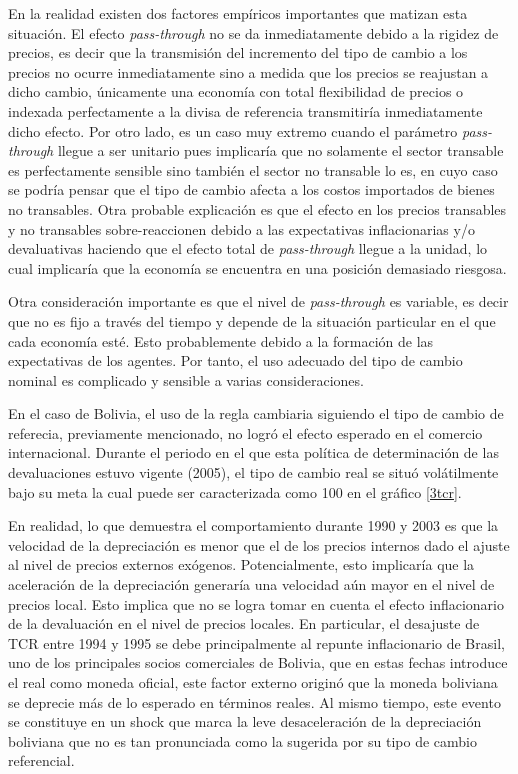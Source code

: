 \documentclass[12pt,letterpaper]{article}
\begin{document}
En la realidad existen dos factores empíricos importantes que matizan esta situación. El efecto \emph{pass-through} no se da inmediatamente debido a la rigidez de precios, es decir que la transmisión del incremento del tipo de cambio a los precios no ocurre inmediatamente sino a medida que los precios se reajustan a dicho cambio, únicamente una economía con total flexibilidad de precios o indexada perfectamente a la divisa de referencia transmitiría inmediatamente dicho efecto. Por otro lado, es un caso muy extremo cuando el parámetro \emph{pass-through} llegue a ser unitario pues implicaría que no solamente el sector transable es perfectamente sensible sino también el sector no transable lo es, en cuyo caso se podría pensar que el tipo de cambio afecta a los costos importados de bienes no transables. Otra probable explicación es que el efecto en los precios transables y no transables sobre-reaccionen debido a las expectativas inflacionarias y/o devaluativas haciendo que el efecto total de \emph{pass-through} llegue a la unidad, lo cual implicaría que la economía se encuentra en una posición demasiado riesgosa.

Otra consideración importante es que el nivel de \emph{pass-through} es variable, es decir que no es fijo a través del tiempo y depende de la situación particular en el que cada economía esté. Esto probablemente debido a la formación de las expectativas de los agentes. Por tanto, el uso adecuado del tipo de cambio nominal es complicado y sensible a varias consideraciones.

En el caso de Bolivia, el uso de la regla cambiaria siguiendo el tipo de cambio de referecia, previamente mencionado, no logró el efecto esperado en el comercio internacional. Durante el periodo en el que esta política de determinación de las devaluaciones estuvo vigente (2005), el tipo de cambio real se situó volátilmente bajo su meta la cual puede ser caracterizada como 100 en el gráfico \ref{3tcr}.

En realidad, lo que demuestra el comportamiento durante 1990 y 2003 es que la velocidad de la depreciación es menor que el de los precios internos dado el ajuste al nivel de precios externos exógenos. Potencialmente, esto implicaría que la aceleración de la depreciación generaría una velocidad aún mayor en el nivel de precios local. Esto implica que no se logra tomar en cuenta el efecto inflacionario de la devaluación en el nivel de precios locales. En particular, el desajuste de TCR entre 1994 y 1995 se debe principalmente al repunte inflacionario de Brasil, uno de los principales socios comerciales de Bolivia, que en estas fechas introduce el real como moneda oficial, este factor externo originó que la moneda boliviana se deprecie más de lo esperado en términos reales. Al mismo tiempo, este evento se constituye en un shock que marca la leve desaceleración de la depreciación boliviana que no es tan pronunciada como la sugerida por su tipo de cambio referencial.
\end{document}
